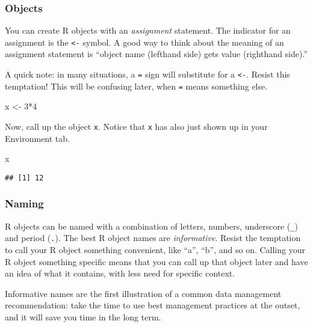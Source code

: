 \documentclass[
]{article}
\newenvironment{Shaded}{\begin{snugshade}}{\end{snugshade}}
\newcommand{\DecValTok}[1]{\textcolor[rgb]{0.00,0.00,0.81}{#1}}
\newcommand{\NormalTok}[1]{#1}
\newcommand{\OtherTok}[1]{\textcolor[rgb]{0.56,0.35,0.01}{#1}}
\newcommand{\SpecialCharTok}[1]{\textcolor[rgb]{0.00,0.00,0.00}{#1}}
\begin{document}
\hypertarget{objects}{%
\subsubsection{Objects}\label{objects}}

You can create R objects with an \emph{assignment} statement. The
indicator for an assignment is the \texttt{\textless{}-} symbol. A good
way to think about the meaning of an assignment statement is ``object
name (lefthand side) gets value (righthand side).''

A quick note: in many situations, a \texttt{=} sign will substitute for
a \texttt{\textless{}-}. Resist this temptation! This will be confusing
later, when \texttt{=} means something else.

\begin{Shaded}
\begin{Highlighting}[]
\NormalTok{x }\OtherTok{\textless{}{-}} \DecValTok{3}\SpecialCharTok{*}\DecValTok{4}
\end{Highlighting}
\end{Shaded}

Now, call up the object \texttt{x}. Notice that \texttt{x} has also just
shown up in your Environment tab.

\begin{Shaded}
\begin{Highlighting}[]
\NormalTok{x}
\end{Highlighting}
\end{Shaded}

\begin{verbatim}
## [1] 12
\end{verbatim}

\hypertarget{naming}{%
\subsubsection{Naming}\label{naming}}

R objects can be named with a combination of letters, numbers,
underscore (\texttt{\_}) and period (\texttt{.}). The best R object
names are \emph{informative}. Resist the temptation to call your R
object something convenient, like ``a'', ``b'', and so on. Calling your
R object something specific means that you can call up that object later
and have an idea of what it contains, with less need for specific
context.

Informative names are the first illustration of a common data management
recommendation: take the time to use best management practices at the
outset, and it will save you time in the long term.
\end{document}
